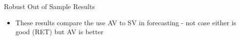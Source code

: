 \documentclass[handout]{beamer}
\begin{document}
\begin{frame}{Robust Out of Sample Results}
\begin{table}
	\end{table}
	\begin{itemize}[<+->]
		\item These results compare the use AV to SV in forecasting - not case either is good (RET) but AV is better
	\end{itemize}
\end{frame}

%			
\end{document}

